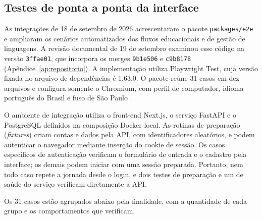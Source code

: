 \subsection{Testes de ponta a ponta da interface}
\label{subsec:e2e-plataforma}

As integrações de 18 de setembro de 2026 acrescentaram o pacote \texttt{packages/e2e} e ampliaram os cenários automatizados dos fluxos educacionais e de gestão de linguagens. A revisão documental de 19 de setembro examinou esse código na versão \texttt{3ffae01}, que incorpora os merges \texttt{9b1e506} e \texttt{c9b8178} (Apêndice~\ref{ap:repositorio}). A implementação utiliza Playwright Test, cuja versão fixada no arquivo de dependências é 1.63.0. O pacote reúne 31 casos em dez arquivos e configura somente o Chromium, com perfil de computador, idioma português do Brasil e fuso de São Paulo \cite{playwright2026intro}.

O ambiente de integração utiliza o front-end Next.js, o serviço FastAPI e o PostgreSQL definidos na composição Docker local. As rotinas de preparação (\textit{fixtures}) criam contas e dados pela API, com identificadores aleatórios, e podem autenticar o navegador mediante inserção do cookie de sessão. Os casos específicos de autenticação verificam o formulário de entrada e o cadastro pela interface; os demais podem iniciar com uma sessão preparada. Portanto, nem todo caso repete a jornada desde o login, e dois testes de preparação e um de saúde do serviço verificam diretamente a API.

Os 31 casos estão agrupados abaixo pela finalidade, com a quantidade de cada grupo e os comportamentos que verificam.

